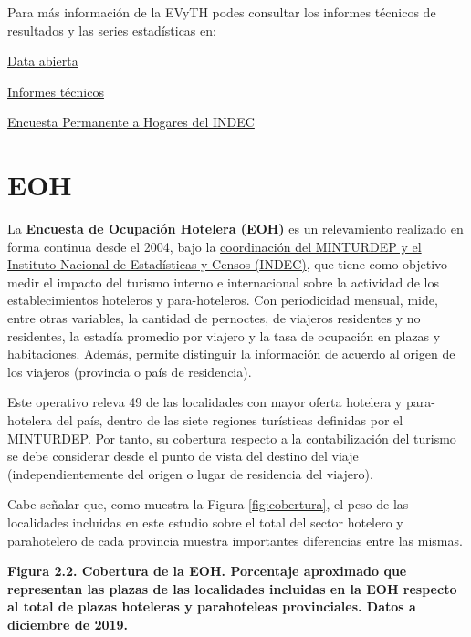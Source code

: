 \documentclass[
]{book}
\begin{document}
Para más información de la EVyTH podes consultar los informes técnicos de resultados y las series estadísticas en:

\href{http://datos.yvera.gob.ar/dataset/encuesta-viajes-turismo-hogares-evyth}{Data abierta}

\href{https://www.yvera.tur.ar/estadistica/info/encuesta-de-viajes-y-turismo-de-los-hogares-evyth}{Informes técnicos}

\href{https://www.indec.gob.ar/indec/web/Institucional-Indec-OperacionesEstadisticas}{Encuesta Permanente a Hogares del INDEC}

\hypertarget{eoh}{%
\section{EOH}\label{eoh}}

La \textbf{Encuesta de Ocupación Hotelera (EOH)} es un relevamiento realizado en forma continua desde el 2004, bajo la \href{https://www.indec.gob.ar/indec/web/Nivel4-Tema-3-13-56}{coordinación del MINTURDEP y el Instituto Nacional de Estadísticas y Censos (INDEC)}, que tiene como objetivo medir el impacto del turismo interno e internacional sobre la actividad de los establecimientos hoteleros y para-hoteleros.
Con periodicidad mensual, mide, entre otras variables, la cantidad de pernoctes, de viajeros residentes y no residentes, la estadía promedio por viajero y la tasa de ocupación en plazas y habitaciones.
Además, permite distinguir la información de acuerdo al origen de los viajeros (provincia o país de residencia).

Este operativo releva 49 de las localidades con mayor oferta hotelera y para-hotelera del país, dentro de las siete regiones turísticas definidas por el MINTURDEP.
Por tanto, su cobertura respecto a la contabilización del turismo se debe considerar desde el punto de vista del destino del viaje (independientemente del origen o lugar de residencia del viajero).

Cabe señalar que, como muestra la Figura \ref{fig:cobertura}, el peso de las localidades incluidas en este estudio sobre el total del sector hotelero y parahotelero de cada provincia muestra importantes diferencias entre las mismas.

\textbf{Figura 2.2. Cobertura de la EOH. Porcentaje aproximado que representan las plazas de las localidades incluidas en la EOH respecto al total de plazas hoteleras y parahoteleas provinciales. Datos a diciembre de 2019.}
\end{document}
